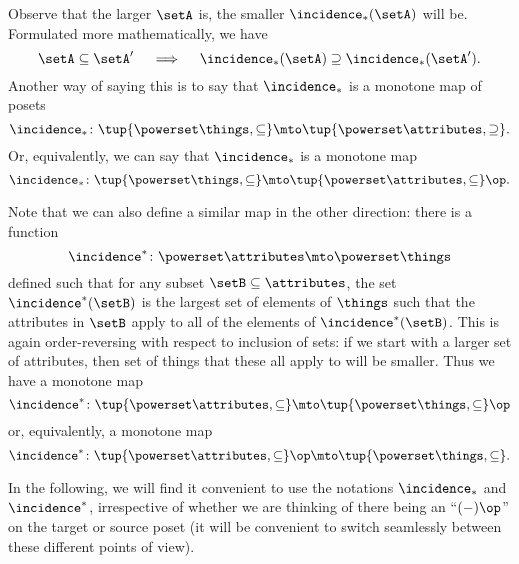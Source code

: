 Observe that the larger $\setA$ is, the smaller $\incidence_*(\setA)$ will be. Formulated more mathematically, we have
\begin{equation}\label{eq:fca-example-pushforward-7}
\setA \subseteq \setA' \quad \implies \quad \incidence_*(\setA) \supseteq \incidence_*(\setA').
\end{equation}
Another way of saying this is to say that $\incidence_*$ is a monotone map of posets 
\begin{equation}\label{eq:fca-example-pushforward-8}
\incidence_* \colon \tup{\powerset \things, \subseteq} \mto \tup{\powerset \attributes, \supseteq}. 
\end{equation}
Or, equivalently, we can say that $\incidence_*$ is a monotone map
\begin{equation}\label{eq:fca-example-pushforward-9}
\incidence_* \colon \tup{\powerset \things, \subseteq} \mto \tup{\powerset \attributes, \subseteq}\op. 
\end{equation}

Note that we can also define a similar map in the other direction: there is a function
\begin{equation}\label{eq:fca-example-pullback-1}
\incidence^* \colon \powerset \attributes \mto \powerset \things
\end{equation}
defined such that for any subset $\setB \subseteq \attributes$, the set $\incidence^*(\setB)$ is the largest set of elements of $\things$ such that the attributes in $\setB$ apply to all of the elements of $\incidence^*(\setB)$. This is again order-reversing with respect to inclusion of sets: if we start with a larger set of attributes, then set of things that these all apply to will be smaller. Thus we have a monotone map 
\begin{equation}\label{eq:fca-example-pullback-2}
\incidence^* \colon \tup{\powerset \attributes, \subseteq} \mto \tup{\powerset \things, \subseteq}\op
\end{equation}
or, equivalently, a monotone map
\begin{equation}\label{eq:fca-example-pullback-3}
\incidence^* \colon \tup{\powerset \attributes, \subseteq}\op \mto \tup{\powerset \things, \subseteq}.
\end{equation}

In the following, we will find it convenient to use the notations $\incidence_*$ and $\incidence^*$, irrespective of whether we are thinking of there being an ``$( - )\op $'' on the target or source poset (it will be convenient to switch seamlessly between these different points of view). 

